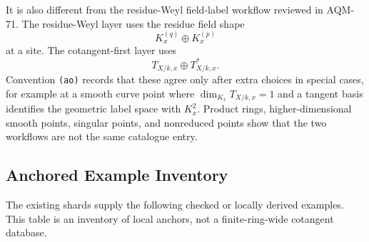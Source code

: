 It is also different from the residue-Weyl field-label workflow reviewed in
AQM-71.  The residue-Weyl layer uses the residue field shape
\[
  K_x^{(q)}\oplus K_x^{(p)}
\]
at a site.  The cotangent-first layer uses
\[
  T_{X/k,x}\oplus T^*_{X/k,x}.
\]
Convention \texttt{(ao)} records that these agree only after extra choices in
special cases, for example at a smooth curve point where
\(\dim_{K_x}T_{X/k,x}=1\) and a tangent basis identifies the geometric label
space with \(K_x^2\).  Product rings, higher-dimensional smooth points,
singular points, and nonreduced points show that the two workflows are not
the same catalogue entry.

\subsection{Anchored Example Inventory}

The existing shards supply the following checked or locally derived examples.
This table is an inventory of local anchors, not a finite-ring-wide cotangent
database.

